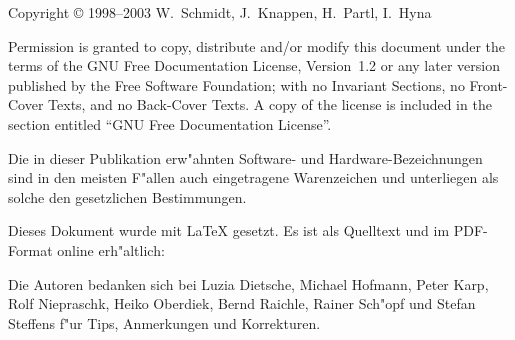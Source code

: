 \documentclass[11pt,a4paper]{article} %
\begin{document}
{\parindent=0cm\thispagestyle{empty}

Copyright \copyright{} 1998--2003 W.~Schmidt, J.~Knappen, H.~Partl, I.~Hyna

\bigskip

{
  Permission is granted to copy, distribute and/or modify this document
  under the terms of the GNU Free Documentation License, Version~1.2
  or any later version published by the Free Software Foundation;
  with no Invariant Sections, no Front-Cover Texts, and no Back-Cover Texts.
  A copy of the license is included in the section entitled ``GNU
  Free Documentation License''.
}

\bigskip

Die in dieser Publikation erw"ahnten Software- und Hardware-Bezeichnungen sind
in den meisten F"allen auch eingetragene Warenzeichen und unterliegen als
solche den gesetzlichen Bestimmungen.

\bigskip

\vfill

Dieses Dokument wurde mit \LaTeX{} gesetzt.
Es ist als Quelltext und im PDF-Format online er\-h"alt\-lich:
\begin{quote}
\end{quote}
\bigskip

Die Autoren bedanken sich bei
Luzia Dietsche, 
Michael Hofmann, 
Peter Karp,
Rolf \mbox{Niepraschk},
Heiko Oberdiek,
Bernd Raichle, 
Rainer Sch"opf und
Stefan Steffens
f"ur Tips, Anmerkungen und  Korrekturen.

}

\newpage

\setcounter{page}{1}
\tableofcontents

\newpage
 

\clearpage


\clearpage
 
 

\clearpage
 

\clearpage


\clearpage


\clearpage


\clearpage
\end{document}
